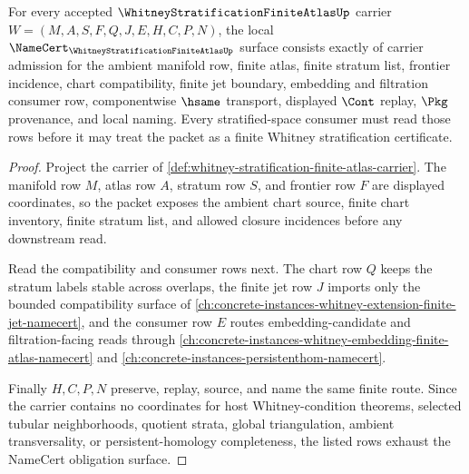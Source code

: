 \begin{theorem}
\label{thm:whitney-stratification-finite-atlas-namecert-obligations}
For every accepted $\WhitneyStratificationFiniteAtlasUp$ carrier $W=(M,A,S,F,Q,J,E,H,C,P,N)$, the local $\NameCert_{\WhitneyStratificationFiniteAtlasUp}$ surface consists exactly of carrier admission for the ambient manifold row, finite atlas, finite stratum list, frontier incidence, chart compatibility, finite jet boundary, embedding and filtration consumer row, componentwise $\hsame$ transport, displayed $\Cont$ replay, $\Pkg$ provenance, and local naming. Every stratified-space consumer must read those rows before it may treat the packet as a finite Whitney stratification certificate.
\end{theorem}
\begin{proof}
Project the carrier of \autoref{def:whitney-stratification-finite-atlas-carrier}. The manifold row $M$, atlas row $A$, stratum row $S$, and frontier row $F$ are displayed coordinates, so the packet exposes the ambient chart source, finite chart inventory, finite stratum list, and allowed closure incidences before any downstream read.

Read the compatibility and consumer rows next. The chart row $Q$ keeps the stratum labels stable across overlaps, the finite jet row $J$ imports only the bounded compatibility surface of \autoref{ch:concrete-instances-whitney-extension-finite-jet-namecert}, and the consumer row $E$ routes embedding-candidate and filtration-facing reads through \autoref{ch:concrete-instances-whitney-embedding-finite-atlas-namecert} and \autoref{ch:concrete-instances-persistenthom-namecert}.

Finally $H,C,P,N$ preserve, replay, source, and name the same finite route. Since the carrier contains no coordinates for host Whitney-condition theorems, selected tubular neighborhoods, quotient strata, global triangulation, ambient transversality, or persistent-homology completeness, the listed rows exhaust the NameCert obligation surface.
\end{proof}

